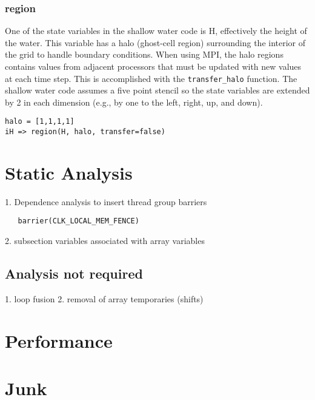 \documentclass[10pt, conference, compsocconf]{IEEEtran}
\begin{document}
\subsubsection{region}

One of the state variables in the shallow water code is H, effectively the
height of the water.  This variable has a halo (ghost-cell region) surrounding
the interior of the grid to handle boundary conditions.  When using
MPI, the halo regions contains values from adjacent processors that must be
updated with new values at each time step.  This is accomplished with the
{\tt transfer\_halo} function.  The shallow water code assumes a five point stencil
so the state variables are extended by 2 in each dimension (e.g., by one to the
left, right, up, and down).

\begin{verbatim}
halo = [1,1,1,1]
iH => region(H, halo, transfer=false)
\end{verbatim}

\section{Static Analysis}

1. Dependence analysis to insert thread group barriers

\begin{verbatim}
   barrier(CLK_LOCAL_MEM_FENCE)
\end{verbatim}

2. subsection variables associated with array variables

\subsection{Analysis not required}

1. loop fusion
2. removal of array temporaries (shifts)

\section{Performance}

\section{Junk}

\cite{chamberlain04zpl,pgi10accelerator}



\end{document}
